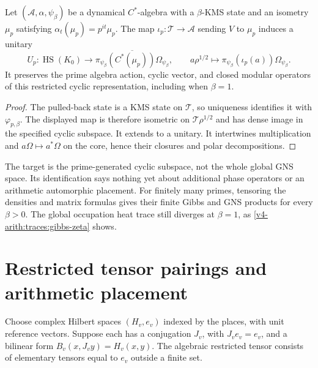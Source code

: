 \begin{proposition}
\label{v4-arith:traces:prime-cyclic-comparison}
Let $(\mathcal A,\alpha,\psi_\beta)$ be a dynamical $C^*$-algebra with a
$\beta$-KMS state and an isometry $\mu_p$ satisfying
$\alpha_t(\mu_p)=p^{it}\mu_p$. The map $\iota_p:\mathcal T\to\mathcal A$
sending $V$ to $\mu_p$ induces a unitary
\[
 U_p:\operatorname{HS}(K_0)
   \longrightarrow
   \overline{\pi_{\psi_\beta}(C^*(\mu_p))\Omega_{\psi_\beta}},
 \qquad
 a\rho^{1/2}\longmapsto
 \pi_{\psi_\beta}(\iota_p(a))\Omega_{\psi_\beta}.
\]
It preserves the prime algebra action, cyclic vector, and closed modular
operators of this restricted cyclic representation, including when
$\beta=1$.
\end{proposition}
\begin{proof}
The pulled-back state is a KMS state on $\mathcal T$, so uniqueness
identifies it with $\varphi_{p,\beta}$. The displayed map is therefore
isometric on $\mathcal T\rho^{1/2}$ and has dense image in the specified
cyclic subspace. It extends to a unitary. It intertwines multiplication and
$a\Omega\mapsto a^*\Omega$ on the core, hence their closures and polar
decompositions.
\end{proof}

The target is the prime-generated cyclic subspace, not the whole global GNS
space. Its identification says nothing yet about additional phase operators
or an arithmetic automorphic placement. For finitely many primes, tensoring
the densities and matrix formulas gives their finite Gibbs and GNS products
for every $\beta>0$. The global occupation heat trace still diverges at
$\beta=1$, as \eqref{v4-arith:traces:gibbs-zeta} shows.

\section{Restricted tensor pairings and arithmetic placement}

Choose complex Hilbert spaces $(H_v,e_v)$ indexed by the places, with unit
reference vectors. Suppose each has a conjugation $J_v$, with $J_ve_v=e_v$,
and a bilinear form $B_v(x,J_vy)=H_v(x,y)$. The algebraic restricted tensor
consists of elementary tensors equal to $e_v$ outside a finite set.

